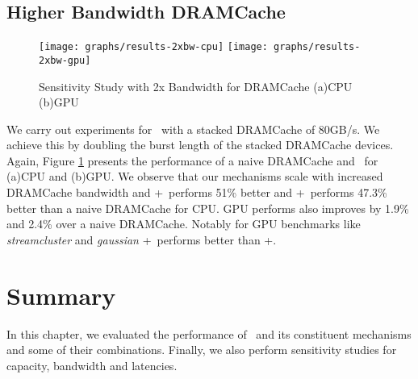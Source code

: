 \subsection{Higher Bandwidth DRAMCache}

\begin{figure}[!htb]
	\centering
	\texttt{[image: graphs/results-2xbw-cpu]}
	\texttt{[image: graphs/results-2xbw-gpu]}
	\caption{Sensitivity Study with 2x Bandwidth for DRAMCache (a)CPU (b)GPU}
	\label{results-ddr3-2133}
\end{figure}

We carry out experiments for \cachename\ with a stacked DRAMCache of 80GB/s. We achieve this by doubling the burst length of the stacked DRAMCache devices. Again, Figure \ref{results-ddr3-2133}  presents the performance of a naive DRAMCache and \cachename\ for (a)CPU and (b)GPU. We observe that our mechanisms scale with increased DRAMCache bandwidth and \bypassname+\prioname\ performs 51\% better and \chaining+\prioname\ performs 47.3\% better than a naive DRAMCache for CPU. GPU performs also improves by 1.9\% and 2.4\% over a naive DRAMCache. Notably for GPU benchmarks like \textit{streamcluster} and \textit{gaussian} \chaining+\prioname\ performs better than \bypassname+\prioname.

\section{Summary}
In this chapter, we evaluated the performance of \cachename\ and its constituent mechanisms and some of their combinations. Finally, we also perform sensitivity studies for capacity, bandwidth and latencies.